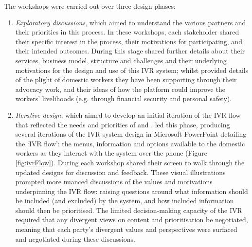 The workshops were carried out over three design phases: 
\begin{enumerate}
\item \textit{Exploratory discussions}, which aimed to understand the various partners and their priorities in this process. In these workshops, each stakeholder shared their specific interest in the process, their motivations for participating, and their intended outcomes. During this stage \PC{} shared further details about their services, business model, structure and challenges and their underlying motivations for the design and use of this IVR system; whilst \NGO{} provided details of the plight of domestic workers they have been supporting through their advocacy work, and their ideas of how the platform could improve the workers' livelihoods (e.g. through financial security and personal safety). 

\item \textit{Iterative design}, which aimed to develop an initial iteration of the IVR flow that reflected the needs and priorities of \PC{} and \NGO{}. \PC{} led this phase, producing several iterations of the IVR system design in Microsoft PowerPoint detailing the `IVR flow': the menus, information and options available to the domestic workers as they interact with the system over the phone (Figure \ref{fig:ivrFlow}). During each workshop \PC{} shared their screen to walk through the updated designs for discussion and feedback. These visual illustrations prompted more nuanced discussions of the values and motivations underpinning the IVR flow: raising questions around what information should be included (and excluded) by the system, and how included information should then be prioritised. The limited decision-making capacity of the IVR required that any divergent views on content and prioritisation be negotiated, meaning that each party's divergent values and perspectives were surfaced and negotiated during these discussions.


\end{enumerate}
